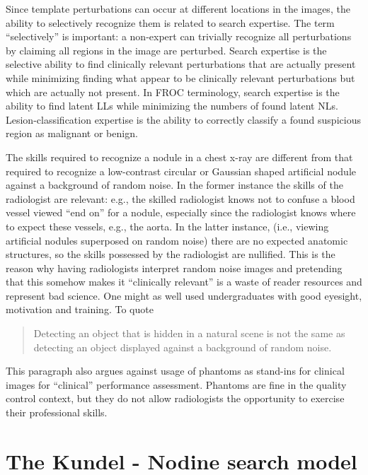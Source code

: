 \documentclass[
]{book}
\begin{document}
Since template perturbations can occur at different locations in the images, the ability to selectively recognize them is related to search expertise. The term ``selectively'' is important: a non-expert can trivially recognize all perturbations by claiming all regions in the image are perturbed. Search expertise is the selective ability to find clinically relevant perturbations that are actually present while minimizing finding what appear to be clinically relevant perturbations but which are actually not present. In FROC terminology, search expertise is the ability to find latent LLs while minimizing the numbers of found latent NLs. Lesion-classification expertise is the ability to correctly classify a found suspicious region as malignant or benign.

The skills required to recognize a nodule in a chest x-ray are different from that required to recognize a low-contrast circular or Gaussian shaped artificial nodule against a background of random noise. In the former instance the skills of the radiologist are relevant: e.g., the skilled radiologist knows not to confuse a blood vessel viewed ``end on'' for a nodule, especially since the radiologist knows where to expect these vessels, e.g., the aorta. In the latter instance, (i.e., viewing artificial nodules superposed on random noise) there are no expected anatomic structures, so the skills possessed by the radiologist are nullified. This is the reason why having radiologists interpret random noise images and pretending that this somehow makes it ``clinically relevant'' is a waste of reader resources and represent bad science. One might as well used undergraduates with good eyesight, motivation and training. To quote \citep{nodine1987using}

\begin{quote}
Detecting an object that is hidden in a natural scene is not the same as detecting an object displayed against a background of random noise.
\end{quote}

This paragraph also argues against usage of phantoms as stand-ins for clinical images for ``clinical'' performance assessment. Phantoms are fine in the quality control context, but they do not allow radiologists the opportunity to exercise their professional skills.

\hypertarget{visual-search-kundel-nodine-model}{%
\section{The Kundel - Nodine search model}\label{visual-search-kundel-nodine-model}}
\end{document}
